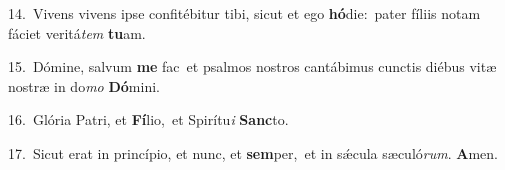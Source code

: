{\numbfont\textcolor{\numbcolor}{14.}}~Vivens vivens ipse confitébitur tibi, sicut et ego \textbf{hó}\-die:~\star pater fíliis notam fáciet veritá\textit{tem} \textbf{tu}\-am.\par
{\numbfont\textcolor{\numbcolor}{15.}}~Dómine, salvum \textbf{me} fac~\star et psalmos nostros cantábimus cunctis diébus vitæ nostræ in do\textit{mo} \textbf{Dó}\-mini.\par
{\numbfont\textcolor{\numbcolor}{16.}}~Glória Patri, et \textbf{Fí}\-lio,~\star et Spirítu\textit{i} \textbf{Sanc}\-to.\par
{\numbfont\textcolor{\numbcolor}{17.}}~Sicut erat in princípio, et nunc, et \textbf{sem}\-per,~\star et in sǽcula sæculó\-\textit{rum}\-. \textbf{A}\-men.\par

